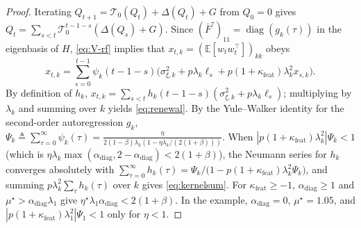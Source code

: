 \documentclass[11pt]{article}
\theoremstyle{remark}
\newcommand{\E}{\mathbb{E}}
\begin{document}
\begin{proof}
Iterating $Q_{t+1} = \mathcal T_0(Q_t) + \Delta(Q_t) + G$ from $Q_0 = 0$ gives $Q_t = \sum_{s<t}\mathcal T_0^{t-1-s}(\Delta(Q_s)+G)$. Since $(\bar F^\tau)_{11} = \operatorname{diag}(g_k(\tau))$ in the eigenbasis of $H$, \eqref{eq:V-rf} implies that $x_{t,k} = (\E[w_t w_t^\top])_{kk}$ obeys
\[
x_{t,k} = \sum_{s=0}^{t-1} \psi_k(t-1-s)\big(\sigma_{\xi,k}^2 + p\lambda_k \ell_s + p(1+\kappa_{\mathrm{feat}})\lambda_k^2 x_{s,k}\big).
\]
By definition of $h_k$, $x_{t,k} = \sum_{s<t}h_k(t-1-s)(\sigma_{\xi,k}^2 + p\lambda_k\ell_s)$; multiplying by $\lambda_k$ and summing over $k$ yields \eqref{eq:renewal}. By the Yule--Walker identity for the second-order autoregression $g_k$, $\Psi_k \triangleq \sum_{\tau=0}^\infty \psi_k(\tau) = \frac{\eta}{2(1-\beta)\lambda_k(1 - \eta\lambda_k/(2(1+\beta)))}$. When $|p(1+\kappa_{\mathrm{feat}})\lambda_k^2|\Psi_k < 1$ (which is $\eta\lambda_k\max(\alpha_{\mathrm{diag}}, 2-\alpha_{\mathrm{diag}}) < 2(1+\beta)$), the Neumann series for $h_k$ converges absolutely with $\sum_{\tau=0}^\infty h_k(\tau) = \Psi_k / \big(1 - p(1+\kappa_{\mathrm{feat}})\lambda_k^2\Psi_k\big)$, and summing $p\lambda_k^2\sum_\tau h_k(\tau)$ over $k$ gives \eqref{eq:kernelsum}. For $\kappa_{\mathrm{feat}}\ge-1$, $\alpha_{\mathrm{diag}}\ge1$ and $\mu^\star>\alpha_{\mathrm{diag}}\lambda_1$ give $\eta^\star\lambda_1\alpha_{\mathrm{diag}}<2(1+\beta)$. In the example, $\alpha_{\mathrm{diag}}=0$, $\mu^\star=1.05$, and $|p(1+\kappa_{\mathrm{feat}})\lambda_1^2|\Psi_1<1$ only for $\eta<1$.
\end{proof}
\end{document}
